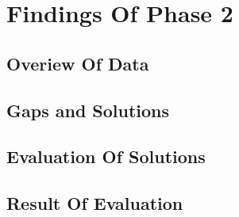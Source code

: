 
\section{Findings Of Phase 2}

\subsection{Overiew Of Data}

\subsection{Gaps and Solutions}

\subsection{Evaluation Of Solutions}

\subsection{Result Of Evaluation}
